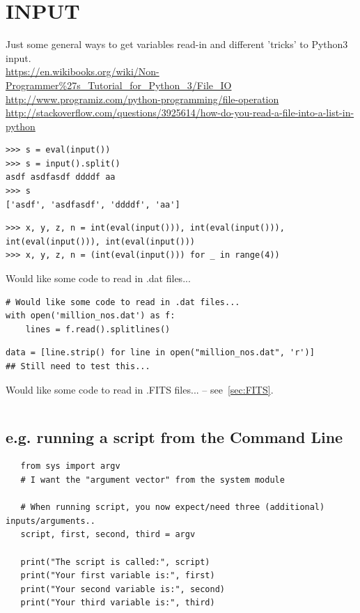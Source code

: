 \documentclass[11pt,a4paper]{article}
\begin{document}
\section{INPUT}
Just some general ways to get variables read-in and different 'tricks' to Python3 input. \\
\href{https://en.wikibooks.org/wiki/Non-Programmer\%27s\_Tutorial\_for\_Python\_3/File\_IO}{https://en.wikibooks.org/wiki/Non-Programmer\%27s\_Tutorial\_for\_Python\_3/File\_IO}\\
\href{http://www.programiz.com/python-programming/file-operation}{http://www.programiz.com/python-programming/file-operation}\\
\href{http://stackoverflow.com/questions/3925614/how-do-you-read-a-file-into-a-list-in-python}{http://stackoverflow.com/questions/3925614/how-do-you-read-a-file-into-a-list-in-python}\\


\begin{lstlisting}
>>> s = eval(input())
>>> s = input().split()
asdf asdfasdf ddddf aa
>>> s
['asdf', 'asdfasdf', 'ddddf', 'aa']
\end{lstlisting}

\begin{lstlisting}
>>> x, y, z, n = int(eval(input())), int(eval(input())), int(eval(input())), int(eval(input()))
>>> x, y, z, n = (int(eval(input())) for _ in range(4))
\end{lstlisting}

Would like some code to read in .dat files...
\begin{lstlisting}
# Would like some code to read in .dat files...
with open('million_nos.dat') as f:
    lines = f.read().splitlines()
\end{lstlisting}

\begin{lstlisting}
data = [line.strip() for line in open("million_nos.dat", 'r')]
## Still need to test this...
\end{lstlisting}


\smallskip
\smallskip
\noindent 
Would like some code to read in .FITS files... -- see~\ref{sec:FITS}. 
\begin{lstlisting}
\end{lstlisting}


    \subsection{e.g. running a script from the Command Line}
    \begin{lstlisting}
   from sys import argv
   # I want the "argument vector" from the system module

   # When running script, you now expect/need three (additional) inputs/arguments..
   script, first, second, third = argv

   print("The script is called:", script)
   print("Your first variable is:", first)
   print("Your second variable is:", second)
   print("Your third variable is:", third)
   \end{lstlisting}
\end{document}
